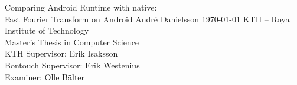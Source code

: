 \documentclass[12pt,a4paper,openright,parskip,final,twoside,en]{csee_msc_thesis} %
\begin{document}
\def\thesistitle{\Large Comparing Android Runtime with native:\\ Fast Fourier Transform on Android}
\def\theauthor{\large André Danielsson}
\def\theaddress{
    KTH -- Royal Institute of Technology\\
    \vspace{3mm}
    Master's Thesis in Computer Science\\
    \vspace{3cm}
    KTH Supervisor: Erik Isaksson\\
    \vspace{5mm}
    Bontouch Supervisor: Erik Westenius\\
    \vspace{5mm}
    Examiner: Olle Bälter
}
\def\theabstract{}
\def\thedate{\today}
\def\thepreface{}
\def\thesweabstract{}

\startpreamble
  {\thesistitle}
  {\theauthor}
  {\thedate}
  {\theabstract}
  {\thepreface}
  {\theaddress}
  {\thesweabstract}













\appendix





\fancyhead[LO]{}%
\fancyhead[RE]{}%
\fancyhead[LE]{\thepage}%
\fancyhead[RO]{\thepage}


\end{document}
